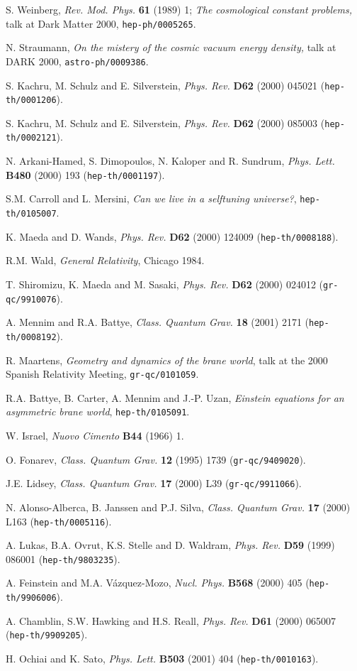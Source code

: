 \documentclass[prd,a4paper,twocolumn,superscriptaddress,nofootinbib,showpacs]{revtex4}
\def\npb#1#2#3{{\it Nucl. Phys.} {\bf B#1} (#2) #3 }
\def\plb#1#2#3{{\it Phys. Lett.} {\bf B#1} (#2) #3 }
\def\prd#1#2#3{{\it Phys. Rev. } {\bf D#1} (#2) #3 }
\def\bb#1{{\tt hep-th/#1}}
\def\grqc#1{{\tt gr-qc/#1}}
\def\heph#1{{\tt hep-ph/#1}}
\def\rmp#1#2#3{{\it Rev. Mod. Phys.} {\bf #1} (#2) #3 }
\def\cqg#1#2#3{{\it Class. Quantum Grav. } {\bf #1} (#2) #3 }
\def\aph#1{{\tt astro-ph/#1}}
\def\nc#1#2#3{{\it Nuovo Cimento } {\bf #1} (#2) #3 }
\begin{document}
\begin{thebibliography}{99}
S. Weinberg, \rmp{61}{1989}{1;} {\it The cosmological constant problems,} talk at
Dark Matter 2000, \heph{0005265}.

N. Straumann, {\it On the mistery of the cosmic vacuum energy density,}
talk at DARK 2000, \aph{0009386}.

S. Kachru, M. Schulz and E. Silverstein, \prd{62}{2000}{045021} (\bb{0001206}).

S. Kachru, M. Schulz and E. Silverstein, \prd{62}{2000}{085003} (\bb{0002121}).

N. Arkani-Hamed, S. Dimopoulos, N. Kaloper and R. Sundrum,
\plb{480}{2000}{193} (\bb{0001197}).

S.M. Carroll and L. Mersini, {\it Can we live in a selftuning universe?}, 
\bb{0105007}.

K. Maeda and D. Wands, \prd{62}{2000}{124009} (\bb{0008188}).


R.M. Wald, {\it General Relativity}, Chicago 1984.

T. Shiromizu, K. Maeda and M. Sasaki, \prd{62}{2000}{024012} (\grqc{9910076}).

A. Mennim and R.A. Battye, \cqg{18}{2001}{2171} (\bb{0008192}).


R. Maartens, {\it Geometry and dynamics of the brane world}, talk at the 2000 Spanish 
Relativity Meeting, \grqc{0101059}.

R.A. Battye, B. Carter, A. Mennim and J.-P. Uzan, {\it Einstein equations for an asymmetric
brane world}, \bb{0105091}.

W. Israel, \nc{B44}{1966}{1.}

O. Fonarev, \cqg{12}{1995}{1739} (\grqc{9409020}).

J.E. Lidsey, \cqg{17}{2000}{L39} (\grqc{9911066}).

N. Alonso-Alberca, B. Janssen and P.J. Silva, \cqg{17}{2000}{L163}
(\bb{0005116}).

A. Lukas, B.A. Ovrut, K.S. Stelle and D. Waldram, \prd{59}{1999}{086001} 
(\bb{9803235}).

A. Feinstein and M.A. V\'azquez-Mozo, \npb{568}{2000}{405} (\bb{9906006}).


A. Chamblin, S.W. Hawking and H.S. Reall, \prd{61}{2000}{065007} (\bb{9909205}).

H. Ochiai and K. Sato, \plb{503}{2001}{404} (\bb{0010163}).


\end{thebibliography}
\end{document}
